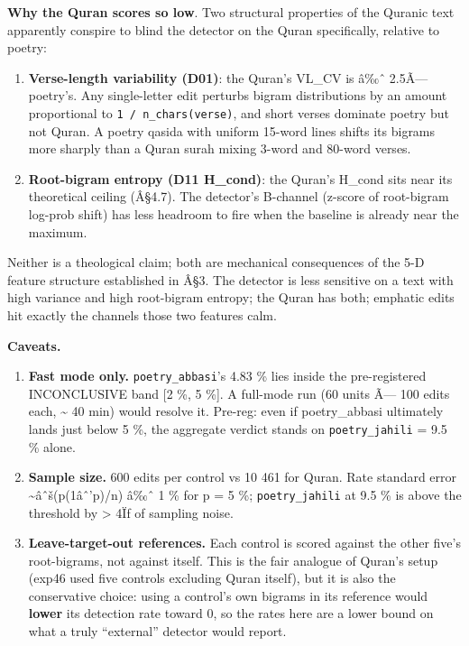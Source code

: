 \documentclass[
]{article}
\begin{document}
\textbf{Why the Quran scores so low}. Two structural properties of the
Quranic text apparently conspire to blind the detector on the Quran
specifically, relative to poetry:

\begin{enumerate}
\def\labelenumi{\arabic{enumi}.}
\item
  \textbf{Verse-length variability (D01)}: the Quran's VL\_CV is â‰ˆ
  2.5Ã--- poetry's. Any single-letter edit perturbs bigram distributions
  by an amount proportional to \texttt{1\ /\ n\_chars(verse)}, and short
  verses dominate poetry but not Quran. A poetry qasida with uniform
  15-word lines shifts its bigrams more sharply than a Quran surah
  mixing 3-word and 80-word verses.
\item
  \textbf{Root-bigram entropy (D11 H\_cond)}: the Quran's H\_cond sits
  near its theoretical ceiling (Â§4.7). The detector's B-channel
  (z-score of root-bigram log-prob shift) has less headroom to fire when
  the baseline is already near the maximum.
\end{enumerate}

Neither is a theological claim; both are mechanical consequences of the
5-D feature structure established in Â§3. The detector is less sensitive
on a text with high variance and high root-bigram entropy; the Quran has
both; emphatic edits hit exactly the channels those two features calm.

\textbf{Caveats.}

\begin{enumerate}
\def\labelenumi{\arabic{enumi}.}
\item
  \textbf{Fast mode only.} \texttt{poetry\_abbasi}'s 4.83 \% lies inside
  the pre-registered INCONCLUSIVE band {[}2 \%, 5 \%{]}. A full-mode run
  (60 units Ã--- 100 edits each, \textasciitilde{} 40 min) would resolve
  it. Pre-reg: even if poetry\_abbasi ultimately lands just below 5 \%,
  the aggregate verdict stands on \texttt{poetry\_jahili} = 9.5 \%
  alone.
\item
  \textbf{Sample size.} 600 edits per control vs 10 461 for Quran. Rate
  standard error \textasciitilde âˆš(p(1âˆ'p)/n) â‰ˆ 1 \% for p = 5 \%;
  \texttt{poetry\_jahili} at 9.5 \% is above the threshold by
  \textgreater{} 4Ïƒ of sampling noise.
\item
  \textbf{Leave-target-out references.} Each control is scored against
  the other five's root-bigrams, not against itself. This is the fair
  analogue of Quran's setup (exp46 used five controls excluding Quran
  itself), but it is also the conservative choice: using a control's own
  bigrams in its reference would \textbf{lower} its detection rate
  toward 0, so the rates here are a lower bound on what a truly
  ``external'' detector would report.
\end{enumerate}
\end{document}
